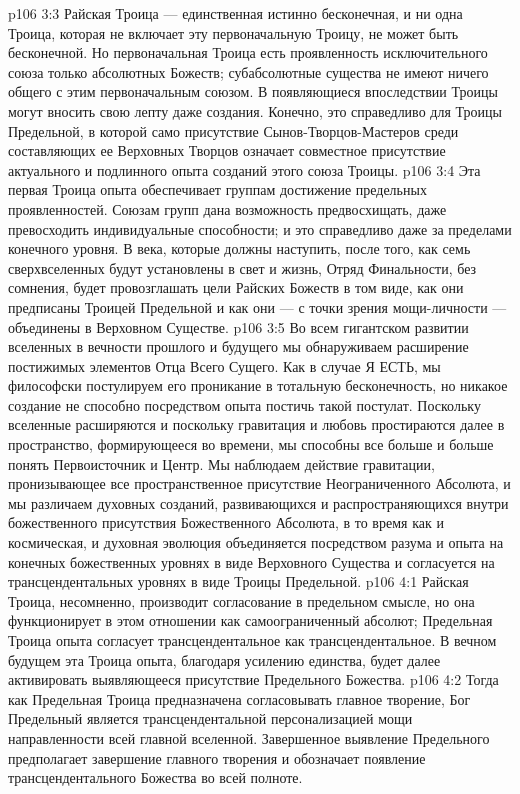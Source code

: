 \vs p106 3:3 Райская Троица --- единственная истинно бесконечная, и ни одна Троица, которая не включает эту первоначальную Троицу, не может быть бесконечной. Но первоначальная Троица есть проявленность исключительного союза только абсолютных Божеств; субабсолютные существа не имеют ничего общего с этим первоначальным союзом. В появляющиеся впоследствии Троицы могут вносить свою лепту даже создания. Конечно, это справедливо для Троицы Предельной, в которой само присутствие Сынов\hyp{}Творцов\hyp{}Мастеров среди составляющих ее Верховных Творцов означает совместное присутствие актуального и подлинного опыта созданий  этого союза Троицы.
\vs p106 3:4 Эта первая Троица опыта обеспечивает группам достижение предельных проявленностей. Союзам групп дана возможность предвосхищать, даже превосходить индивидуальные способности; и это справедливо даже за пределами конечного уровня. В века, которые должны наступить, после того, как семь сверхвселенных будут установлены в свет и жизнь, Отряд Финальности, без сомнения, будет провозглашать цели Райских Божеств в том виде, как они предписаны Троицей Предельной и как они --- с точки зрения мощи\hyp{}личности --- объединены в Верховном Существе.
\vs p106 3:5 \pc Во всем гигантском развитии вселенных в вечности прошлого и будущего мы обнаруживаем расширение постижимых элементов Отца Всего Сущего. Как в случае Я ЕСТЬ, мы философски постулируем его проникание в тотальную бесконечность, но никакое создание не способно посредством опыта постичь такой постулат. Поскольку вселенные расширяются и поскольку гравитация и любовь простираются далее в пространство, формирующееся во времени, мы способны все больше и больше понять Первоисточник и Центр. Мы наблюдаем действие гравитации, пронизывающее все пространственное присутствие Неограниченного Абсолюта, и мы различаем духовных созданий, развивающихся и распространяющихся внутри божественного присутствия Божественного Абсолюта, в то время как и космическая, и духовная эволюция объединяется посредством разума и опыта на конечных божественных уровнях в виде Верховного Существа и согласуется на трансцендентальных уровнях в виде Троицы Предельной.
\vs p106 4:1 Райская Троица, несомненно, производит согласование в предельном смысле, но она функционирует в этом отношении как самоограниченный абсолют; Предельная Троица опыта согласует трансцендентальное как трансцендентальное. В вечном будущем эта Троица опыта, благодаря усилению единства, будет далее активировать выявляющееся присутствие Предельного Божества.
\vs p106 4:2 Тогда как Предельная Троица предназначена согласовывать главное творение, Бог Предельный является трансцендентальной персонализацией мощи направленности всей главной вселенной. Завершенное выявление Предельного предполагает завершение главного творения и обозначает появление трансцендентального Божества во всей полноте.

